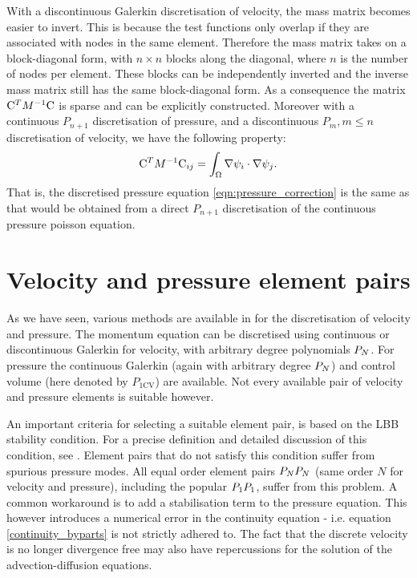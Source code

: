 With a discontinuous Galerkin discretisation of velocity, the mass matrix
becomes easier to invert. This is because the test functions only overlap
if they are associated with nodes in the same element. Therefore the mass
matrix takes on a block-diagonal form, with $n\times n$ blocks along
the diagonal, where $n$ is the number of nodes per element. These blocks
can be independently inverted and the inverse mass matrix still has the
same block-diagonal form. As a consequence the matrix
$\mathrm{C}^T M^{-1} \mathrm{C}$ is sparse and can be explicitly
constructed. Moreover with a continuous $P_{n+1}$ discretisation of pressure,
and a discontinuous $P_m, m\leq n$ discretisation of velocity, we
have the following property\citep{cotter2009}:
\begin{equation*}
  \mathrm{C}^T M^{-1} \mathrm{C}_{ij}=\int_\Omega \nabla \psi_i\cdot\nabla \psi_j.
\end{equation*}
That is, the discretised pressure equation \eqref{eqn:pressure_correction}
is the same as that would be obtained from a direct $P_{n+1}$
discretisation of the continuous pressure poisson equation.

\section{Velocity and pressure element pairs}
\label{Sect:velocity_pressure_element_pairs}
As we have seen, various methods are available in \fluidity for the discretisation of
velocity and pressure. The momentum equation can be discretised
using continuous or discontinuous Galerkin for velocity, with arbitrary degree
polynomials $P_N$. For pressure the continuous Galerkin (again with arbitrary degree $P_N$)
and control volume (here denoted by $P_{1\text{CV}}$) are available. Not every available 
pair of velocity and pressure elements is suitable however.

An important criteria for selecting a suitable element pair, 
is based on the LBB stability condition. For a precise definition and 
detailed discussion of this condition, see \cite{gresho1988}. Element pairs 
that do not satisfy this condition suffer from spurious pressure modes. All equal order element pairs
$P_NP_N$ (same order $N$ for velocity and pressure), including the popular $P_1P_1$, suffer from this problem.
A common workaround is to add
a stabilisation term to the pressure equation. This however introduces a numerical error in 
the continuity equation - i.e. equation \eqref{continuity_byparts} is not strictly adhered to. 
The fact that the discrete velocity is no longer divergence free may 
also have repercussions for the solution of the advection-diffusion equations.

